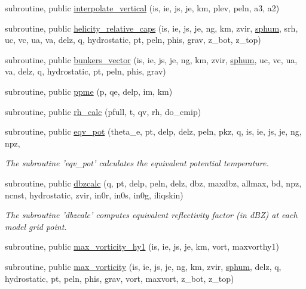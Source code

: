 \begin{DoxyCompactItemize}
\item 
subroutine, public \hyperlink{classfv__diagnostics__mod_a9693cb095338e3001f569fb82c40e338}{interpolate\-\_\-vertical} (is, ie, js, je, km, plev, peln, a3, a2)
\item 
subroutine, public \hyperlink{classfv__diagnostics__mod_a8d99b551592ce6697f3f294273d6af07}{helicity\-\_\-relative\-\_\-caps} (is, ie, js, je, ng, km, zvir, \hyperlink{classfv__diagnostics__mod_a60dad9285aa4277546ef49434b1d9362}{sphum}, srh, uc, vc, ua, va, delz, q, hydrostatic, pt, peln, phis, grav, z\-\_\-bot, z\-\_\-top)
\item 
subroutine, public \hyperlink{classfv__diagnostics__mod_afdf3bfba8318b7d5530b07c0ed643f23}{bunkers\-\_\-vector} (is, ie, js, je, ng, km, zvir, \hyperlink{classfv__diagnostics__mod_a60dad9285aa4277546ef49434b1d9362}{sphum}, uc, vc, ua, va, delz, q, hydrostatic, pt, peln, phis, grav)
\item 
subroutine, public \hyperlink{classfv__diagnostics__mod_a2694f86ad7b4d5d39d84d0e7e2c5db1e}{ppme} (p, qe, delp, im, km)
\item 
subroutine, public \hyperlink{classfv__diagnostics__mod_a00017df493f244643b46606e69dbdede}{rh\-\_\-calc} (pfull, t, qv, rh, do\-\_\-cmip)
\item 
subroutine, public \hyperlink{classfv__diagnostics__mod_ae1be71cdaa7c0e061f88177e8a500849}{eqv\-\_\-pot} (theta\-\_\-e, pt, delp, delz, peln, pkz, q, is, ie, js, je, ng, npz,
\begin{DoxyCompactList}\small\item\em The subroutine 'eqv\-\_\-pot' calculates the equivalent potential temperature. \end{DoxyCompactList}\item 
subroutine, public \hyperlink{classfv__diagnostics__mod_adeb37b1ddf5ade0d3dc16f09bd15ca70}{dbzcalc} (q, pt, delp, peln, delz, dbz, maxdbz, allmax, bd, npz, ncnst, hydrostatic, zvir, in0r, in0s, in0g, iliqskin)
\begin{DoxyCompactList}\small\item\em The subroutine 'dbzcalc' computes equivalent reflectivity factor (in d\-B\-Z) at each model grid point. \end{DoxyCompactList}\item 
subroutine, public \hyperlink{classfv__diagnostics__mod_afe461976226b554c0ad59ea8e42a85cc}{max\-\_\-vorticity\-\_\-hy1} (is, ie, js, je, km, vort, maxvorthy1)
\item 
subroutine, public \hyperlink{classfv__diagnostics__mod_a8c84d3194849e9e0f04fda229b66e562}{max\-\_\-vorticity} (is, ie, js, je, ng, km, zvir, \hyperlink{classfv__diagnostics__mod_a60dad9285aa4277546ef49434b1d9362}{sphum}, delz, q, hydrostatic, pt, peln, phis, grav, vort, maxvort, z\-\_\-bot, z\-\_\-top)

\end{DoxyCompactItemize}
